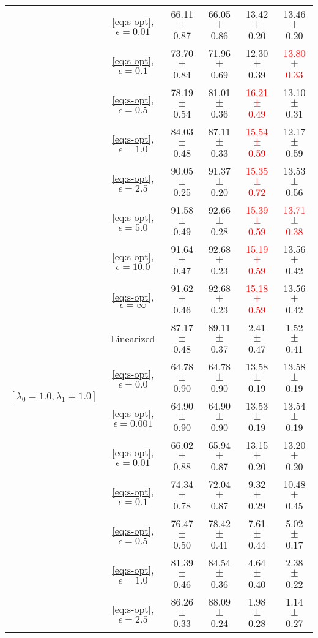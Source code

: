\begin{table}[h]
\begin{adjustbox}{max width=1\textwidth,center}
\begin{tabular}{cccccc}
& \ref{eq:s-opt}, $\epsilon=0.01$  & 66.11 $\pm$ 0.87 & 66.05 $\pm$ 0.86   & 13.42 $\pm$ 0.20 & 13.46 $\pm$ 0.20  \\
& \ref{eq:s-opt}, $\epsilon=0.1$  & 73.70 $\pm$ 0.84 & 71.96 $\pm$ 0.69   & 12.30 $\pm$ 0.39 & \textcolor{red}{13.80 $\pm$ 0.33 }  \\
& \ref{eq:s-opt}, $\epsilon=0.5$  & 78.19 $\pm$ 0.54 & 81.01 $\pm$ 0.36   & \textcolor{red}{16.21 $\pm$ 0.49 }& 13.10 $\pm$ 0.31  \\
& \ref{eq:s-opt}, $\epsilon=1.0$  & 84.03 $\pm$ 0.48 & 87.11 $\pm$ 0.33   & \textcolor{red}{15.54 $\pm$ 0.59 }& 12.17 $\pm$ 0.59  \\
& \ref{eq:s-opt}, $\epsilon=2.5$  & 90.05 $\pm$ 0.25 & 91.37 $\pm$ 0.20   & \textcolor{red}{15.35 $\pm$ 0.72 }& 13.53 $\pm$ 0.56  \\
& \ref{eq:s-opt}, $\epsilon=5.0$  & 91.58 $\pm$ 0.49 & 92.66 $\pm$ 0.28   & \textcolor{red}{15.39 $\pm$ 0.59 }& \textcolor{red}{13.71 $\pm$ 0.38 }\\
& \ref{eq:s-opt}, $\epsilon=10.0$  & 91.64 $\pm$ 0.47 & 92.68 $\pm$ 0.23   & \textcolor{red}{15.19 $\pm$ 0.59 }& 13.56 $\pm$ 0.42  \\
& \ref{eq:s-opt}, $\epsilon=\infty$  & 91.62 $\pm$ 0.46 & 92.68 $\pm$ 0.23   & \textcolor{red}{15.18 $\pm$ 0.59 }& 13.56 $\pm$ 0.42  \\
    \midrule
    \multirow{4}{*}{$[\lambda_0=1.0, \lambda_1 = 1.0]$}
    & Linearized & 87.17 $\pm$ 0.48 & 89.11 $\pm$ 0.37   & 2.41 $\pm$ 0.47 & 1.52 $\pm$ 0.41\\
& \ref{eq:s-opt}, $\epsilon=0.0$  & 64.78 $\pm$ 0.90 & 64.78 $\pm$ 0.90   & 13.58 $\pm$ 0.19 & 13.58 $\pm$ 0.19\\
& \ref{eq:s-opt}, $\epsilon=0.001$  & 64.90 $\pm$ 0.90 & 64.90 $\pm$ 0.90   & 13.53 $\pm$ 0.19 & 13.54 $\pm$ 0.19\\
& \ref{eq:s-opt}, $\epsilon=0.01$  & 66.02 $\pm$ 0.88 & 65.94 $\pm$ 0.87   & 13.15 $\pm$ 0.20 & 13.20 $\pm$ 0.20\\
& \ref{eq:s-opt}, $\epsilon=0.1$  & 74.34 $\pm$ 0.78 & 72.04 $\pm$ 0.87   & 9.32 $\pm$ 0.29 & 10.48 $\pm$ 0.45\\
& \ref{eq:s-opt}, $\epsilon=0.5$  & 76.47 $\pm$ 0.50 & 78.42 $\pm$ 0.41   & 7.61 $\pm$ 0.44 & 5.02 $\pm$ 0.17\\
& \ref{eq:s-opt}, $\epsilon=1.0$  & 81.39 $\pm$ 0.46 & 84.54 $\pm$ 0.36   & 4.64 $\pm$ 0.40 & 2.38 $\pm$ 0.22 \\
& \ref{eq:s-opt}, $\epsilon=2.5$  & 86.26 $\pm$ 0.33 & 88.09 $\pm$ 0.24   & 1.98 $\pm$ 0.28 & 1.14 $\pm$ 0.27  \\

\end{tabular}
\end{adjustbox}
\end{table}
